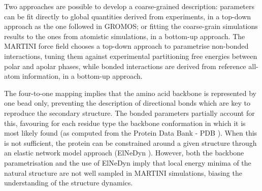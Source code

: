 Two approaches are possible to develop a coarse-grained description: parameters can be fit directly to global quantities derived from experiments, in a top-down approach as the one followed in GROMOS; or fitting the coarse-grain simulations results to the ones from atomistic simulations, in a bottom-up approach.
%
The MARTINI force field chooses a top-down approach to parametrise non-bonded interactions, tuning them against experimental partitioning free energies between polar and apolar phases, while bonded interactions are derived from reference all-atom information, in a bottom-up approach.

The four-to-one mapping implies that the amino acid backbone is represented by one bead only, preventing the description of directional bonds which are key to reproduce the secondary structure. The bonded parameters partially account for this, favouring for each residue type the backbone conformation in which it is most likely found (as computed from the Protein Data Bank - PDB \citep{PDB}). When this is not sufficient, the protein can be constrained around a given structure through an elastic network model approach (ElNeDyn \citep{Periole2009}). However, both the backbone parametrisation and the use of ElNeDyn imply that local energy minima of the natural structure are not well sampled in MARTINI simulations, biasing the understanding of the structure dynamics.

